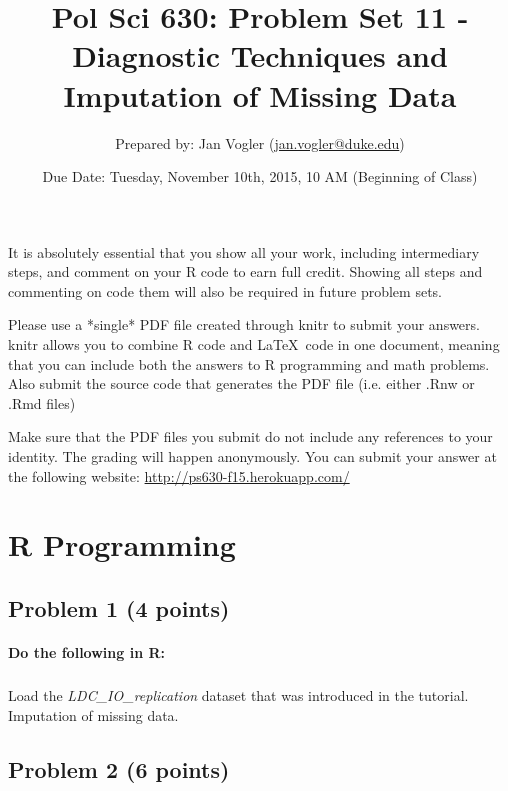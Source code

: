 \documentclass[12pt]{article}
\begin{document}
\title{Pol Sci 630: Problem Set 11 - Diagnostic Techniques and Imputation of Missing Data}

\author{Prepared by: Jan Vogler (\href{mailto:jan.vogler@duke.edu}{jan.vogler@duke.edu})}

\date{Due Date: Tuesday, November 10th, 2015, 10 AM (Beginning of Class)}
 
\maketitle 



It is absolutely essential that you show all your work, including intermediary steps, and comment on your R code to earn full credit. Showing all steps and commenting on code them will also be required in future problem sets.

Please use a *single* PDF file created through knitr to submit your answers. knitr allows you to combine R code and \LaTeX \ code in one document, meaning that you can include both the answers to R programming and math problems. Also submit the source code that generates the PDF file (i.e. either .Rnw or .Rmd files)

Make sure that the PDF files you submit do not include any references to your identity. The grading will happen anonymously. You can submit your answer at the following website: \url{http://ps630-f15.herokuapp.com/}



\section*{R Programming}

\subsection*{Problem 1 (4 points)}

\paragraph{Do the following in R:}

\subparagraph{} Load the \textit{LDC\_IO\_replication} dataset that was introduced in the tutorial. Imputation of missing data.



\subsection*{Problem 2 (6 points)}
\end{document}
